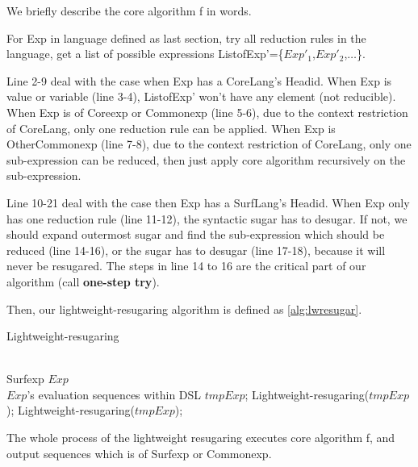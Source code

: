 We briefly describe the core algorithm f in words.

For Exp in language defined as last section, try all reduction rules in the language, get a list of possible expressions ListofExp'=\{$Exp'_{1}$,$Exp'_{2}$,$\ldots$\}.

Line 2-9 deal with the case when Exp has a CoreLang's Headid. When Exp is value or variable (line 3-4), ListofExp' won't have any element (not reducible). When Exp is of Coreexp or Commonexp (line 5-6), due to the context restriction of CoreLang, only one reduction rule can be applied. When Exp is OtherCommonexp (line 7-8), due to the context restriction of CoreLang, only one sub-expression can be reduced, then just apply core algorithm recursively on the sub-expression.

Line 10-21 deal with the case then Exp has a SurfLang's Headid. When Exp only has one reduction rule (line 11-12), the syntactic sugar has to desugar. If not, we should expand outermost sugar and find the sub-expression which should be reduced (line 14-16), or the sugar has to desugar (line 17-18), because it will never be resugared. The steps in line 14 to 16 are the critical part of our algorithm (call {\bfseries one-step try}\label{mark:onesteptry}).


Then, our lightweight-resugaring algorithm is defined as \ref{alg:lwresugar}.

\begin{algorithm}
	\caption{Lightweight-resugaring}
	\label{alg:lwresugar}     %
	\begin{algorithmic}[1]       %
		\REQUIRE ~~\\      %
		Surfexp $Exp$
		\ENSURE ~~\\     %
		$Exp$'s evaluation sequences within DSL
		\RETURN
		\PRINT $tmpExp$;
		\STATE Lightweight-resugaring($tmpExp$);
		\ELSE
		\STATE Lightweight-resugaring($tmpExp$);
		\ENDIF
		\ENDWHILE

	\end{algorithmic}
\end{algorithm}

The whole process of the lightweight resugaring executes core algorithm f, and output sequences which is of Surfexp or Commonexp.

